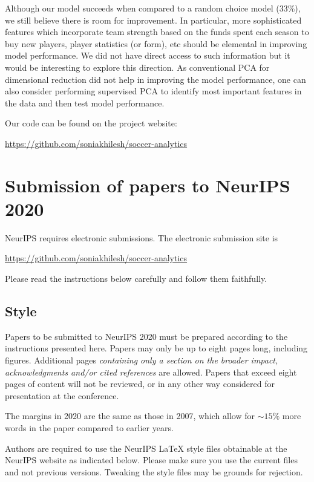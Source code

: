 \documentclass{article}
\begin{document}
Although our model succeeds  when compared to a random choice model (33\%), we still believe there is room for improvement. In particular, more sophisticated features which incorporate team strength based on the funds spent each season to buy new players, player statistics (or form), etc should be elemental in improving model performance. We did not have direct access to such information but it would be interesting to explore this direction. 
As conventional PCA for dimensional reduction did not help in improving the model performance, one can also consider performing supervised PCA \cite{supervisedPCA}  to identify most important features in the data and then test model performance.

Our code can be found on the project website:
\begin{center}
	\url{https://github.com/soniakhilesh/soccer-analytics}
\end{center}

\iffalse
\section{Submission of papers to NeurIPS 2020}

NeurIPS requires electronic submissions.  The electronic submission site is
\begin{center}
  \url{https://github.com/soniakhilesh/soccer-analytics}
\end{center}

Please read the instructions below carefully and follow them faithfully.

\subsection{Style}

Papers to be submitted to NeurIPS 2020 must be prepared according to the
instructions presented here. Papers may only be up to eight pages long,
including figures. Additional pages \emph{containing only a section on the broader impact, acknowledgments and/or cited references} are allowed. Papers that exceed eight pages of content will not be reviewed, or in any other way considered for
presentation at the conference.

The margins in 2020 are the same as those in 2007, which allow for $\sim$$15\%$
more words in the paper compared to earlier years.

Authors are required to use the NeurIPS \LaTeX{} style files obtainable at the
NeurIPS website as indicated below. Please make sure you use the current files
and not previous versions. Tweaking the style files may be grounds for
rejection.
\end{document}
